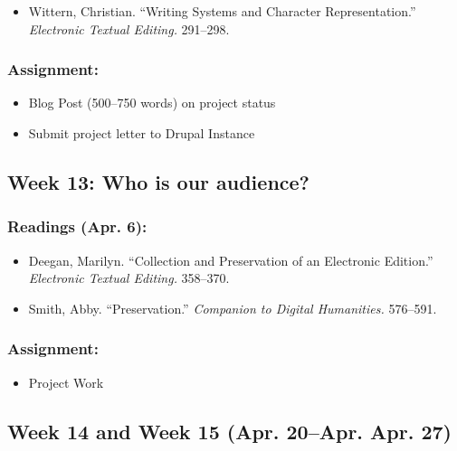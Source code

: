 \documentclass[]{article}
\begin{document}
\begin{itemize}
\itemsep1pt\parskip0pt
\item
  Wittern, Christian. ``Writing Systems and Character Representation.''
  \emph{Electronic Textual Editing.} 291--298.
\end{itemize}

\subsubsection{Assignment:}\label{assignment-2}

\begin{itemize}
\itemsep1pt\parskip0pt
\item
  Blog Post (500--750 words) on project status
\item
  Submit project letter to Drupal Instance
\end{itemize}

\subsection{Week 13: Who is our
audience?}\label{week-13-who-is-our-audience}

\subsubsection{Readings (Apr. 6):}\label{readings-apr.-6}

\begin{itemize}
\itemsep1pt\parskip0pt
\item
  Deegan, Marilyn. ``Collection and Preservation of an Electronic
  Edition.'' \emph{Electronic Textual Editing.} 358--370.
\item
  Smith, Abby. ``Preservation.'' \emph{Companion to Digital Humanities.}
  576--591.
\end{itemize}

\subsubsection{Assignment:}\label{assignment-3}

\begin{itemize}
\itemsep1pt\parskip0pt
\item
  Project Work
\end{itemize}

\subsection{Week 14 and Week 15 (Apr. 20--Apr. Apr.
27)}\label{week-14-and-week-15-apr.-20apr.-apr.-27}
\end{document}
